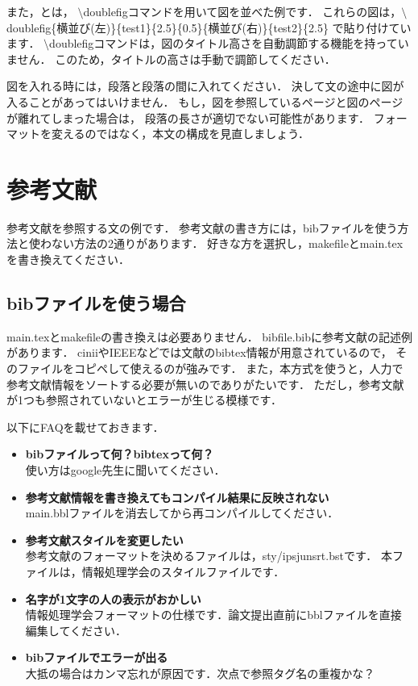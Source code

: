 また，とは，
$\setminus$doublefigコマンドを用いて図を並べた例です．
これらの図は，$\setminus$doublefig\{横並び(左)\}\{test1\}\{2.5\}\{0.5\}\{横並び(右)\}\{test2\}\{2.5\}
で貼り付けています．
$\setminus$doublefigコマンドは，図のタイトル高さを自動調節する機能を持っていません．
このため，タイトルの高さは手動で調節してください．


図を入れる時には，段落と段落の間に入れてください．
決して文の途中に図が入ることがあってはいけません．
もし，図を参照しているページと図のページが離れてしまった場合は，
段落の長さが適切でない可能性があります．
フォーマットを変えるのではなく，本文の構成を見直しましょう．


\section{参考文献}
\label{sec:bib}
参考文献を参照する文の例です\cite{1983_Ibaraki}．
参考文献の書き方には，bibファイルを使う方法と使わない方法の2通りがあります．
好きな方を選択し，makefileとmain.texを書き換えてください．

\subsection{bibファイルを使う場合}
main.texとmakefileの書き換えは必要ありません．
bibfile.bibに参考文献の記述例があります．
ciniiやIEEEなどでは文献のbibtex情報が用意されているので，
そのファイルをコピペして使えるのが強みです．
また，本方式を使うと，人力で参考文献情報をソートする必要が無いのでありがたいです．
ただし，参考文献が1つも参照されていないとエラーが生じる模様です\cite{test1}．

以下にFAQを載せておきます．
\begin{itemize}
        \item   {\bf bibファイルって何？bibtexって何？}\\
        使い方はgoogle先生に聞いてください．
        \item   {\bf 参考文献情報を書き換えてもコンパイル結果に反映されない}\\
        main.bblファイルを消去してから再コンパイルしてください．
        \item   {\bf 参考文献スタイルを変更したい}\\
        参考文献のフォーマットを決めるファイルは，sty/ipsjunsrt.bstです．
        本ファイルは，情報処理学会のスタイルファイルです．
        \item   {\bf 名字が1文字の人の表示がおかしい}\\
        情報処理学会フォーマットの仕様です．論文提出直前にbblファイルを直接編集してください．
        \item   {\bf bibファイルでエラーが出る}\\
        大抵の場合はカンマ忘れが原因です．次点で参照タグ名の重複かな？
\end{itemize}



